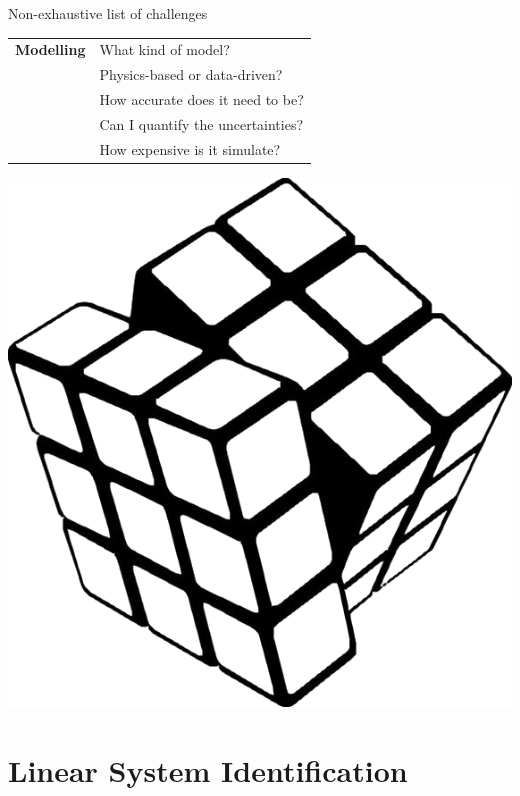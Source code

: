 \documentclass[aspectratio=169,compress,12pt,dvipsnames]{beamer}
\begin{document}
\begin{frame}[t, c]{Non-exhaustive list of challenges}
    \vfill
    \begin{minipage}{.68\textwidth}
        \centering
        \begin{tabular}{rl}
            \textbf{Modelling}  &   What kind of model?                 \\
                                &   Physics-based or data-driven?       \\
                                &   How accurate does it need to be?    \\
                                &   Can I quantify the uncertainties?   \\
                                &   How expensive is it simulate?
        \end{tabular}
    \end{minipage}%
    \hfill
    \begin{minipage}{.28\textwidth}
        \centering
        \includegraphics[width=\textwidth]{rubik_cube.png}
    \end{minipage}
    \vfill
\end{frame}

\section{Linear System Identification}
\end{document}
